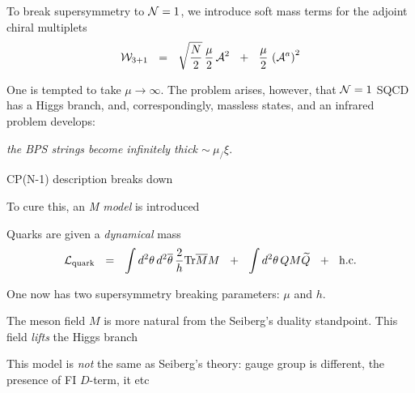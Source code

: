 \documentclass[12pt,letterpaper,landscape,KOMA,smallheadings,calcdimensions,display]{powersem}
\begin{document}
\begin{slide}
\vspace*{\fill}
	To break supersymmetry to $ \mathcal{N}=1 $, we introduce soft mass terms for the
	adjoint chiral multiplets
\[
	\mathcal{W}_{3+1} ~~=~~ \sqrt{\frac{N}{2}}\,\frac{\mu}{2}\, \mathcal{A}^2 ~~+~~ \frac{\mu}{2}\,\left(\mathcal{A}^a\right)^2 
\] 

	One is tempted to take $ \mu \to \infty $.
	The problem arises, however, that $ \mathcal{N}=1 $ SQCD has a Higgs branch, and, correspondingly,
	massless states, and an infrared problem develops:

	\emph{the BPS strings become infinitely thick $ \sim~ \mu_/\xi $}.

	CP(N-1) description breaks down
\vspace*{\fill}	
\end{slide}


\begin{slide}
\vspace*{\fill}
	To cure this, an \emph{\it M model} is introduced

	Quarks are given a {\it dynamical} mass
\[
	\mathcal{L}_{\rm quark} ~~=~~ \int d^2\theta\, d^2\overline{\theta}\,  \frac{2}{h} {\rm Tr} \overline{M}M  ~~+~~
			\int d^2\theta  \, Q M\widetilde{Q} ~~+~~ \text{h.c.}
\]
	
	One now has two supersymmetry breaking parameters: $ \mu $ and $ h $.

	The meson field $ M $ is more natural from the Seiberg's duality standpoint.
	This field \emph{lifts} the Higgs branch
	
	This model is {\it not} the same as Seiberg's theory: gauge group is different, the
	presence of FI $D$-term, {it etc}
\vspace*{\fill}
\end{slide}
\end{document}
